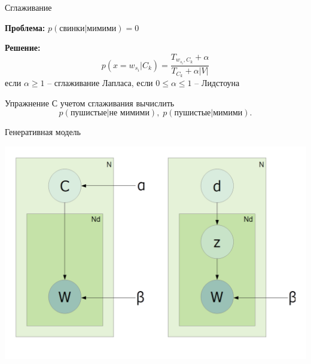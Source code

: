 \documentclass[aspectratio=169]{beamer}
\begin{document}
\begin{frame}{Сглаживание}

{\bf Проблема:} $p(\text{свинки}|\text{мимими}) = 0$

\vspace{1em}
{\bf Решение:}
\[
p(x = w_{s_i} | C_k) = \frac{T_{w_{s_i}, C_k} + \alpha}{T_{C_k} + \alpha |V|}
\]
если $\alpha \geq 1$ -- сглаживание Лапласа, если $0 \leq \alpha \leq 1$ -- Лидстоуна

\vspace{1em}
\begin{exampleblock}{Упражнение}
С учетом сглаживания вычислить 
\[
p(\text{пушистые}|\text{не мимими}), \; p(\text{пушистые}|\text{мимими}).
\]
\end{exampleblock}

\end{frame}


\begin{frame}{Генеративная модель}

\begin{center}
\includegraphics[scale=0.3]{images/lsa.png}
\end{center}

\end{frame}

\end{document}
